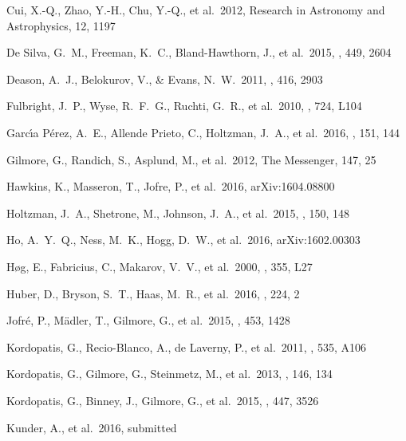\documentclass[preprint,trackchanges]{aastex}
\begin{document}
\begin{thebibliography}{dummy}
 Cui, X.-Q., Zhao, Y.-H., Chu, Y.-Q., et al.\ 2012, Research in Astronomy and Astrophysics, 12, 1197 

 De Silva, G.~M., Freeman, K.~C., Bland-Hawthorn, J., et al.\ 2015, \mnras, 449, 2604 

 Deason, A.~J., Belokurov, V., \& Evans, N.~W.\ 2011, \mnras, 416, 2903 

 Fulbright, J.~P., Wyse, R.~F.~G., Ruchti, G.~R., et al.\ 2010, \apjl, 724, L104 

 Garc{\'{\i}}a P{\'e}rez, A.~E., Allende Prieto, C., Holtzman, J.~A., et al.\ 2016, \aj, 151, 144 

 Gilmore, G., Randich, S., Asplund, M., et al.\ 2012, The Messenger, 147, 25

 Hawkins, K., Masseron, T., Jofre, P., et al.\ 2016, arXiv:1604.08800 

 Holtzman, J.~A., Shetrone, M., Johnson, J.~A., et al.\ 2015, \aj, 150, 148 

 Ho, A.~Y.~Q., Ness, M.~K., Hogg, D.~W., et al.\ 2016, arXiv:1602.00303 
 
 H{\o}g, E., Fabricius, C., Makarov, V.~V., et al.\ 2000, \aap, 355, L27 

 Huber, D., Bryson, S.~T., Haas, M.~R., et al.\ 2016, \apjs, 224, 2 

 Jofr{\'e}, P., M{\"a}dler, T., Gilmore, G., et al.\ 2015, \mnras, 453, 1428 

 Kordopatis, G., Recio-Blanco, A., de Laverny, P., et al.\ 2011, \aap, 535, A106 

 Kordopatis, G., Gilmore, G., Steinmetz, M., et al.\ 2013, \aj, 146, 134 

 Kordopatis, G., Binney, J., Gilmore, G., et al.\ 2015, \mnras, 447, 3526 

 Kunder, A., et al.\ 2016, submitted


\end{thebibliography}
\end{document}
